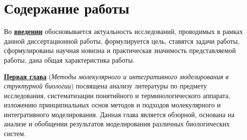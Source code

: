 {       %
         }
{}                          %
\section*{Содержание работы}




Во \underline{\textbf{введении}} обосновывается актуальность исследований, проводимых в рамках данной диссертационной работы, формулируется цель, ставятся задачи работы, сформулированы научная новизна и практическая значимость представляемой работы, дана общая характеристика работы.


\underline{\textbf{Первая глава}} (\textit{Методы молекулярного и интегративного моделирования в структурной биологии}) посвящена анализу литературы по предмету исследования, систематизации понятийного и терминологического аппарата, изложению принципиальных основ методов и подходов молекулярного и интегративного моделирования. Данная глава является обзорной, основана на анализе и обобщении результатов моделирования различных биологических систем. \nocite{hada_histone_2019,bass_effect_2019,armeev_linking_2019,shaytan_structural_2018,gorkovets_joint_2018,xiao_molecular_2017,shaytan_hydroxyl-radical_2017,gribkova_investigation_2017,el_kennani_ms_histonedb_2017,chertkov_dual_2017,armeev_modeling_2016,armeev_nucleosome_2016,biswas_genomic_2016,draizen_histonedb_2016,lyubitelev_structure_2016,shaitan_dynamics_2016,shaytan_coupling_2016,shaytan_trajectories_2016,valieva_large-scale_2016,armeev_conformational_2015,armeev_molecular_2015,frank_direct_2015,gaykalova_structural_2015,goncearenco_structural_2015,shaytan_nucleosome_2015,bozdaganyan_comparative_2014,chang_analysis_2014,kasimova_voltage-gated_2014,nishi_physicochemical_2014,sokolova_genome_2014,yolamanova_peptide_2013,shaitan_influence_2013,orekhov_calculation_2012,shaytan_self-assembling_2011,shaytan_self-organizing_2011}

